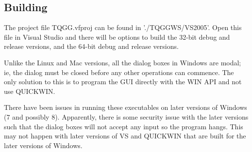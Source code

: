 \documentclass[10pt]{article}
\begin{document}
\subsection{Building}
The project file TQGG.vfproj can be found in './TQGGWS/VS2005'. Open this file in Visual Studio
and there will be options to build the 32-bit debug and release versions, and the 64-bit debug 
and release versions.

Unlike the Linux and Mac versions, all the dialog boxes in Windows are modal; ie, the dialog must be 
closed before any other operations can commence. The only solution to this is to program the GUI
directly with the WIN API and not use QUICKWIN.

There have been issues in running these executables on later versions of Windows (7 and possibly 8).
Apparently, there is some security issue with the later versions such that the dialog boxes will
not accept any input so the program hangs. This may not happen with later versions of VS and QUICKWIN that
are built for the later versions of Windows.
\end{document}
